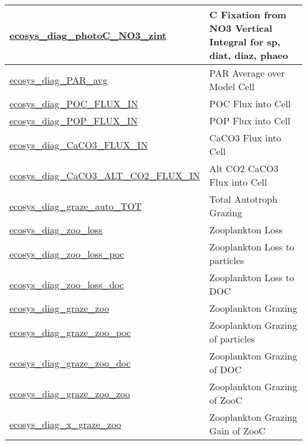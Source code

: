{\begin{center}
\begin{longtable}{| p{2.0in} | p{4.0in} |}
    \hline
    \hyperref[subsec:var_sec_forcing_ecosys_diag_photoC_NO3_zint]{ecosys\_diag\_photoC\_NO3\_zint} & C Fixation from NO3 Vertical Integral for sp, diat, diaz, phaeo \\
    \hline
    \hyperref[subsec:var_sec_forcing_ecosys_diag_PAR_avg]{ecosys\_diag\_PAR\_avg} & PAR Average over Model Cell \\
    \hline
    \hyperref[subsec:var_sec_forcing_ecosys_diag_POC_FLUX_IN]{ecosys\_diag\_POC\_FLUX\_IN} & POC Flux into Cell \\
    \hline
    \hyperref[subsec:var_sec_forcing_ecosys_diag_POP_FLUX_IN]{ecosys\_diag\_POP\_FLUX\_IN} & POP Flux into Cell \\
    \hline
    \hyperref[subsec:var_sec_forcing_ecosys_diag_CaCO3_FLUX_IN]{ecosys\_diag\_CaCO3\_FLUX\_IN} & CaCO3 Flux into Cell \\
    \hline
    \hyperref[subsec:var_sec_forcing_ecosys_diag_CaCO3_ALT_CO2_FLUX_IN]{ecosys\_diag\_CaCO3\_ALT\_\-CO2\_FLUX\_IN} & Alt CO2 CaCO3 Flux into Cell \\
    \hline
    \hyperref[subsec:var_sec_forcing_ecosys_diag_graze_auto_TOT]{ecosys\_diag\_graze\_auto\_TOT} & Total Autotroph Grazing \\
    \hline
    \hyperref[subsec:var_sec_forcing_ecosys_diag_zoo_loss]{ecosys\_diag\_zoo\_loss} & Zooplankton Loss \\
    \hline
    \hyperref[subsec:var_sec_forcing_ecosys_diag_zoo_loss_poc]{ecosys\_diag\_zoo\_loss\_poc} & Zooplankton Loss to particles \\
    \hline
    \hyperref[subsec:var_sec_forcing_ecosys_diag_zoo_loss_doc]{ecosys\_diag\_zoo\_loss\_doc} & Zooplankton Loss to DOC \\
    \hline
    \hyperref[subsec:var_sec_forcing_ecosys_diag_graze_zoo]{ecosys\_diag\_graze\_zoo} & Zooplankton Grazing \\
    \hline
    \hyperref[subsec:var_sec_forcing_ecosys_diag_graze_zoo_poc]{ecosys\_diag\_graze\_zoo\_poc} & Zooplankton Grazing of particles \\
    \hline
    \hyperref[subsec:var_sec_forcing_ecosys_diag_graze_zoo_doc]{ecosys\_diag\_graze\_zoo\_doc} & Zooplankton Grazing of DOC \\
    \hline
    \hyperref[subsec:var_sec_forcing_ecosys_diag_graze_zoo_zoo]{ecosys\_diag\_graze\_zoo\_zoo} & Zooplankton Grazing of ZooC \\
    \hline
    \hyperref[subsec:var_sec_forcing_ecosys_diag_x_graze_zoo]{ecosys\_diag\_x\_graze\_zoo} & Zooplankton Grazing Gain of ZooC \\

\end{longtable}
\end{center}}

